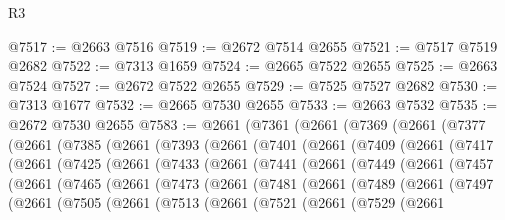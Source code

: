 \begin{lexlean}{R3}
\begin{coremodule}
@7517 := @2663 @7516
@7519 := @2672 @7514 @2655
@7521 := @7517 @7519 @2682
@7522 := @7313 @1659
@7524 := @2665 @7522 @2655
@7525 := @2663 @7524
@7527 := @2672 @7522 @2655
@7529 := @7525 @7527 @2682
@7530 := @7313 @1677
@7532 := @2665 @7530 @2655
@7533 := @2663 @7532
@7535 := @2672 @7530 @2655
@7583 := @2661
    (@7361
      (@2661
        (@7369
          (@2661
            (@7377
              (@2661
                (@7385
                  (@2661
                    (@7393
                      (@2661
                        (@7401
                          (@2661
                            (@7409
                              (@2661
                                (@7417
                                  (@2661
                                    (@7425
                                      (@2661
                                        (@7433
                                          (@2661
                                            (@7441
                                              (@2661
                                                (@7449
                                                  (@2661
                                                    (@7457
                                                      (@2661
                                                        (@7465
                                                          (@2661
                                                            (@7473
                                                              (@2661
                                                                (@7481
                                                                  (@2661
                                                                    (@7489
                                                                      (@2661
                                                                        (@7497
                                                                          (@2661
                                                                            (@7505
                                                                              (@2661
                                                                                (@7513
                                                                                  (@2661
                                                                                    (@7521
                                                                                      (@2661
                                                                                        (@7529
                                                                                          (@2661

\end{coremodule}
\end{lexlean}
